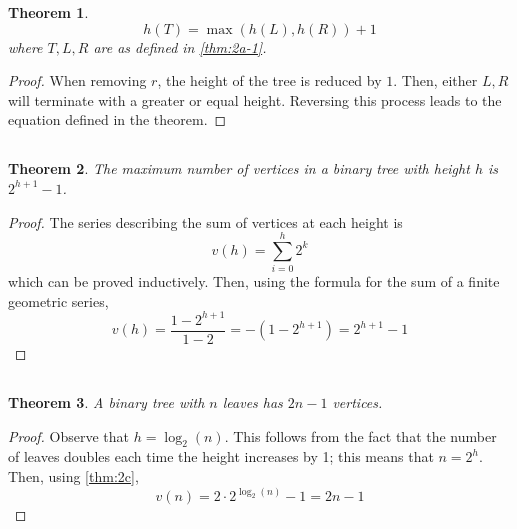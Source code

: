 \documentclass{article}
\newtheorem{theorem}{Theorem}
\begin{document}
\begin{theorem}
    \begin{equation}
        h(T) = \max(h(L), h(R)) + 1
    \end{equation}
    where \(T, L, R\) are as defined in \autoref{thm:2a-1}.
\end{theorem}
\begin{proof}
    When removing \(r\), the height of the tree is reduced by \(1\).
    Then, either \(L, R\) will terminate with a greater or equal height.
    Reversing this process leads to the equation defined in the theorem.
\end{proof}

\subsection{}

\begin{theorem} \label{thm:2c}
    The maximum number of vertices in a binary tree with height \(h\) is \(2^{h + 1} - 1\).
\end{theorem}
\begin{proof}
    The series describing the sum of vertices at each height is
    \begin{equation}
        v(h) = \sum_{i = 0}^h 2^k
    \end{equation}
    which can be proved inductively.
    Then, using the formula for the sum of a finite geometric series,
    \begin{equation}
        v(h) = \frac{1 - 2^{h + 1}}{1 - 2} = -(1 - 2^{h + 1}) = 2^{h + 1} - 1
    \end{equation}
\end{proof}

\subsection{}

\begin{theorem}
    A binary tree with \(n\) leaves has \(2n - 1\) vertices.
\end{theorem}
\begin{proof}
    Observe that \(h = \log_2(n)\).
    This follows from the fact that the number of leaves doubles each time the height increases by 1; this means that \(n = 2^h\).
    Then, using \autoref{thm:2c},
    \begin{equation}
        v(n) = 2 \cdot 2^{\log_2(n)} - 1 = 2n - 1
    \end{equation}
\end{proof}
\end{document}
